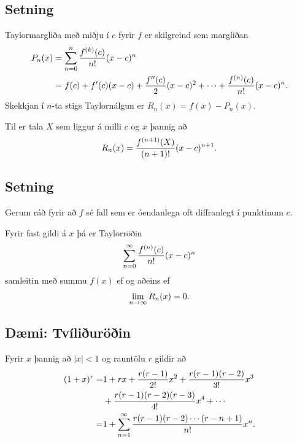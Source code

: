\documentclass[b5paper,10pt,icelandic]{sphinxmanual}
\begin{document}
\subsection{Setning}
\label{kafli10:id4}
Taylormargliða með miðju í \(c\) fyrir \(f\) er skilgreind sem
margliðan
\begin{gather}
\begin{split}\begin{aligned}
  P_n(x)& =\sum_{n=0}^n \frac{f^{(k)}(c)}{n!}(x-c)^n \\
  &=f(c)+f'(c)(x-c)+ \frac{f''(c)}{2}(x-c)^2+\cdots+\frac{f^{(n)}(c)}{n!}(x-c)^n.\end{aligned}\end{split}\notag
\end{gather}
Skekkjan í \(n\)-ta stigs Taylornálgun er
\(R_n(x)=f(x)-P_n(x)\).

Til er tala \(X\) sem liggur á milli \(c\) og \(x\) þannig
að
\begin{gather}
\begin{split}R_n(x)=\frac{f^{(n+1)}(X)}{(n+1)!}(x-c)^{n+1}.\end{split}\notag
\end{gather}

\subsection{Setning}
\label{kafli10:id5}
Gerum ráð fyrir að \(f\) sé fall sem er óendanlega oft diffranlegt í
punktinum \(c\).

Fyrir fast gildi á \(x\) þá er Taylorröðin
\begin{gather}
\begin{split}\sum_{n=0}^\infty \frac{f^{(n)}(c)}{n!}(x-c)^n\end{split}\notag
\end{gather}
samleitin með summu \(f(x)\) ef og aðeins ef
\begin{gather}
\begin{split}\lim_{n\rightarrow\infty}R_n(x)=0.\end{split}\notag
\end{gather}

\subsection{Dæmi: Tvíliðuröðin}
\label{kafli10:daemi-tviliuroin}\label{kafli10:index-7}
Fyrir \(x\) þannig að \(|x|<1\) og rauntölu \(r\) gildir að
\begin{gather}
\begin{split}\begin{aligned}
(1+x)^r =& 1+rx+\frac{r(r-1)}{2!}x^2+ \frac{r(r-1)(r-2)}{3!}x^3 \\
&+\frac{r(r-1)(r-2)(r-3)}{4!}x^4+\cdots\\
=& 1+ \sum_{n=1}^\infty \frac{r(r-1)(r-2)\cdots(r-n+1)}{n!}x^n.\end{aligned}\end{split}\notag
\end{gather}
\end{document}
